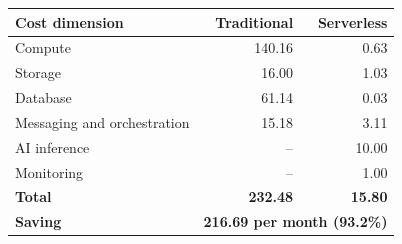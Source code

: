%
%
%        
\begin{tabular}{@{}lrr@{}}
  \toprule
  Cost dimension & Traditional & Serverless \\
  \midrule
  Compute                     & 140.16 &  0.63 \\
  Storage                     &  16.00 &  1.03 \\
  Database                    &  61.14 &  0.03 \\
  Messaging and orchestration &  15.18 &  3.11 \\
  AI inference                &     -- & 10.00 \\
  Monitoring                  &     -- &  1.00 \\
  \midrule
  \textbf{Total}              & \textbf{232.48} & \textbf{15.80} \\
  \textbf{Saving}             & \multicolumn{2}{c}{\textbf{216.69 per month (93.2\%)}} \\
  \bottomrule
\end{tabular}
